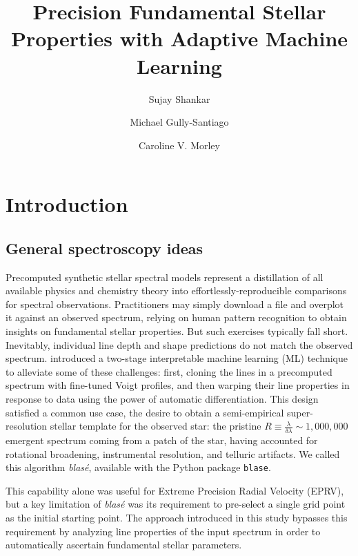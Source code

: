 \documentclass[twocolumn]{aastex631}
\begin{document}
\title{Precision Fundamental Stellar Properties with Adaptive Machine Learning}
    
\author[0000-0002-2290-6810]{Sujay Shankar}
\author[0000-0002-4020-3457]{Michael Gully-Santiago}
\author[0000-0002-4404-0456]{Caroline V. Morley}

\begin{abstract}
    \blindtext
\end{abstract}

\keywords{}


\section{Introduction}



\subsection{General spectroscopy ideas}

Precomputed synthetic stellar spectral models represent a distillation of all available physics
and chemistry theory into effortlessly-reproducible comparisons for spectral observations.
Practitioners may simply download a file and overplot it against an observed spectrum, relying on
human pattern recognition to obtain insights on fundamental stellar properties. But such exercises
typically fall short. Inevitably, individual line depth and shape predictions do not match the
observed spectrum. \citet{2022ApJ...941..200G} introduced a two-stage interpretable machine learning (ML)
technique to alleviate some of these challenges: first, cloning the lines in a precomputed spectrum
with fine-tuned Voigt profiles, and then warping their line properties in response to data using
the power of automatic differentiation. This design satisfied a common use case, the desire to
obtain a semi-empirical super-resolution stellar template for the observed star: the pristine
$R\equiv\frac{\lambda}{\delta \lambda}\sim1,000,000$ emergent spectrum coming from a patch of the star,
having accounted for rotational broadening, instrumental resolution, and telluric artifacts.
We called this algorithm \emph{blas\'e}, available with the Python package \texttt{blase}.

This capability alone was useful for Extreme Precision Radial Velocity (EPRV), but a key limitation
of \emph{blas\'e} was its requirement to pre-select a single grid point as the initial starting point. The approach
introduced in this study bypasses this requirement by analyzing line properties of the input spectrum
in order to automatically ascertain fundamental stellar parameters.
\end{document}
